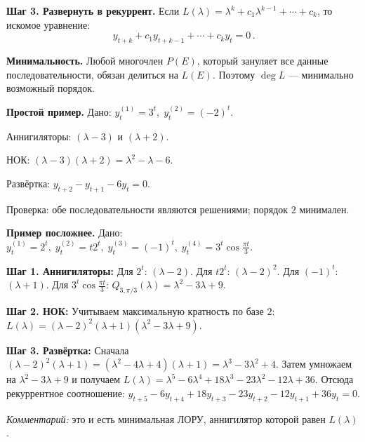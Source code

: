 \textbf{Шаг 3. Развернуть в рекуррент.} Если $L(\lambda)=\lambda^k+c_1\lambda^{k-1}+\cdots+c_k$, то искомое уравнение:
\[
 \boxed{\,y_{t+k}+c_1 y_{t+k-1}+\cdots+c_k y_t=0\,}.
\]

\textbf{Минимальность.} Любой многочлен $P(E)$, который зануляет все данные последовательности, обязан делиться на $L(E)$. Поэтому $\deg L$ — минимально возможный порядок.

\bigskip

\textbf{Простой пример.} Дано: $y_t^{(1)}=3^t,\; y_t^{(2)}=(-2)^t$. \\
\begin{HSESteps}
  \item Аннигиляторы: $(\lambda-3)$ и $(\lambda+2)$.
  \item НОК: $(\lambda-3)(\lambda+2)=\lambda^2-\lambda-6$.
  \item Развёртка: $\boxed{y_{t+2}-y_{t+1}-6y_t=0}$.
\end{HSESteps}
Проверка: обе последовательности являются решениями; порядок $2$ минимален.

\bigskip

\textbf{Пример посложнее.} Дано: $y^{(1)}_t=2^t,\; y^{(2)}_t=t2^t,\; y^{(3)}_t=(-1)^t,\; y^{(4)}_t=3^t\cos\tfrac{\pi t}{3}$.

\textbf{Шаг 1. Аннигиляторы:} Для $2^t$: $(\lambda-2)$. Для $t2^t$: $(\lambda-2)^2$. Для $(-1)^t$: $(\lambda+1)$. Для $3^t\cos\tfrac{\pi t}{3}$: $Q_{3,\pi/3}(\lambda)=\lambda^2-3\lambda+9$.

\textbf{Шаг 2. НОК:} Учитываем максимальную кратность по базе $2$: $L(\lambda)=(\lambda-2)^2(\lambda+1)(\lambda^2-3\lambda+9)$.

\textbf{Шаг 3. Развёртка:} Сначала $(\lambda-2)^2(\lambda+1)=(\lambda^2-4\lambda+4)(\lambda+1)=\lambda^3-3\lambda^2+4$. Затем умножаем на $\lambda^2-3\lambda+9$ и получаем $L(\lambda)=\lambda^5-6\lambda^4+18\lambda^3-23\lambda^2-12\lambda+36$. Отсюда рекуррентное соотношение: $\boxed{y_{t+5}-6y_{t+4}+18y_{t+3}-23y_{t+2}-12y_{t+1}+36y_t=0}$.

\textit{Комментарий:} это и есть минимальная ЛОРУ, аннигилятор которой равен $L(\lambda)$.
